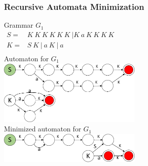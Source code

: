 \documentclass{beamer}
\begin{document}
	\begin{frame} 
		\frametitle{Recursive Automata Minimization}
		\vspace{-12pt}
		\begin{center}
			{Grammar $G_1$\\
			\vspace{5pt}
			$
			\begin{array}{rl}
			S =& K\ K\ K\ K\ K\ K \ |K\ a\ K\ K\ K\ K \\
			K =& S\ K\ |\ a\ K\ |\ a \\
			\end{array}
			$
			}
		    \\
		    \vspace{12pt}
		    Automaton for $G_1$
		    \\
		    \vspace{5pt}
		    {
				\includegraphics[width=7cm]{pictures/G1initial.pdf}
			}\\
			\vspace{8pt}
			Minimized automaton for $G_1$
			\\
			\vspace{5pt}
		    {
				\includegraphics[width=7cm]{pictures/G1automaton.pdf}
			}
		\end{center}

	\end{frame}
	
\end{document}
